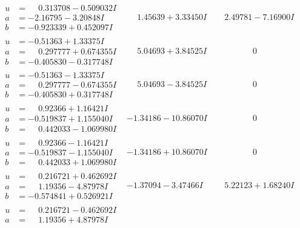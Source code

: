 \documentclass[1p]{elsarticle_modified}
\theoremstyle{definition}
\begin{document}
$$\begin{array}{c|c|c}
 \hline 
\begin{aligned}
u &= \phantom{-}0.313708 - 0.509032 I \\
a &= -2.16795 - 3.20848 I \\
b &= -0.923339 + 0.452097 I\end{aligned}
 & \phantom{-}1.45639 + 3.33450 I & \phantom{-}2.49781 - 7.16900 I \\ \hline\begin{aligned}
u &= -0.51363 + 1.33375 I \\
a &= \phantom{-}0.297777 + 0.674355 I \\
b &= -0.405830 - 0.317748 I\end{aligned}
 & \phantom{-}5.04693 + 3.84525 I & \phantom{-0.000000 } 0 \\ \hline\begin{aligned}
u &= -0.51363 - 1.33375 I \\
a &= \phantom{-}0.297777 - 0.674355 I \\
b &= -0.405830 + 0.317748 I\end{aligned}
 & \phantom{-}5.04693 - 3.84525 I & \phantom{-0.000000 } 0 \\ \hline\begin{aligned}
u &= \phantom{-}0.92366 + 1.16421 I \\
a &= -0.519837 + 1.155040 I \\
b &= \phantom{-}0.442033 - 1.069980 I\end{aligned}
 & -1.34186 - 10.86070 I & \phantom{-0.000000 } 0 \\ \hline\begin{aligned}
u &= \phantom{-}0.92366 - 1.16421 I \\
a &= -0.519837 - 1.155040 I \\
b &= \phantom{-}0.442033 + 1.069980 I\end{aligned}
 & -1.34186 + 10.86070 I & \phantom{-0.000000 } 0 \\ \hline\begin{aligned}
u &= \phantom{-}0.216721 + 0.462692 I \\
a &= \phantom{-}1.19356 - 4.87978 I \\
b &= -0.574841 + 0.526921 I\end{aligned}
 & -1.37094 - 3.47466 I & \phantom{-}5.22123 + 1.68240 I \\ \hline\begin{aligned}
u &= \phantom{-}0.216721 - 0.462692 I \\
a &= \phantom{-}1.19356 + 4.87978 I \\

\end{aligned}
\end{array}$$
\end{document}
